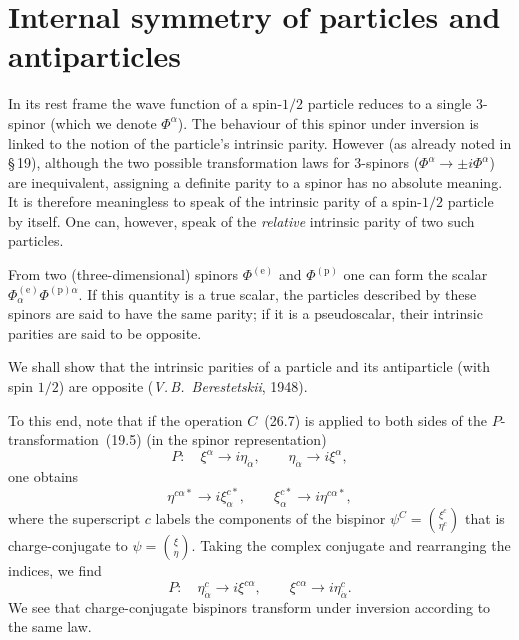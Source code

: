 \section{Internal symmetry of particles and antiparticles}

In its rest frame the wave function of a spin-$1/2$ particle reduces to a single 3-spinor (which we denote $\Phi^\alpha$). The behaviour of this spinor under inversion is linked to the notion of the particle's intrinsic parity. However (as already noted in \S\,19), although the two possible transformation laws for 3-spinors ($\Phi^\alpha \to \pm i\Phi^\alpha$) are inequivalent, assigning a definite parity to a spinor has no absolute meaning. It is therefore meaningless to speak of the intrinsic parity of a spin-$1/2$ particle by itself. One can, however, speak of the \emph{relative} intrinsic parity of two such particles.

From two (three-dimensional) spinors $\Phi^{(\text{e})}$ and $\Phi^{(\text{p})}$ one can form the scalar $\Phi_\alpha^{(\text{e})}\Phi^{(\text{p})\alpha}$. If this quantity is a true scalar, the particles described by these spinors are said to have the same parity; if it is a pseudoscalar, their intrinsic parities are said to be opposite.

We shall show that the intrinsic parities of a particle and its antiparticle (with spin $1/2$) are opposite (\emph{V.\,B.~Berestetskii}, 1948).

To this end, note that if the operation $C$~(26.7) is applied to both sides of the $P$-transformation~(19.5) (in the spinor representation)
\begin{equation}
P:\quad \xi^\alpha \to i\eta_{\dot\alpha},\qquad \eta_{\dot\alpha} \to i\xi^\alpha,
\tag{27.1}
\end{equation}
one obtains
\[
\eta^{c\alpha*} \to i\xi^{c*}_{\alpha},\qquad \xi^{c*}_\alpha \to i\eta^{c\alpha*},
\]
where the superscript $c$ labels the components of the bispinor $\psi^C = \binom{\xi^c}{\eta^c}$ that is charge-conjugate to $\psi = \binom{\xi}{\eta}$. Taking the complex conjugate and rearranging the indices, we find
\begin{equation}
P:\quad \eta^c_{\dot\alpha} \to i\xi^{c\alpha},\qquad \xi^{c\alpha} \to i\eta^c_{\dot\alpha}.
\tag{27.2}
\end{equation}
We see that charge-conjugate bispinors transform under inversion according to the same law.


